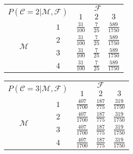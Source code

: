 \documentclass[preview]{standalone}
\newcommand{\M}{\mathcal{M}}
\newcommand{\F}{\mathcal{F}}
\newcommand{\C}{\mathcal{C}}
\begin{document}
	\vspace{1\mytextsize} \newline
	\begin{tabular}{|c|c|c|c|c|}
		\hline
		\multicolumn{2}{|c|}{\multirow{2}{*}{$P(\C = 2|\M,\F)$}} &               \multicolumn{3}{c|}{$\F$}                \\ \cline{3-5}
		\multicolumn{2}{|c|}{}                                 &       $1$        &      $2$       &        $3$         \\ \hline
		\multirow{4}{*}{$\M$} &               $1$                & $\frac{31}{100}$ & $\frac{7}{25}$ & $\frac{589}{1750}$ \\ \cline{2-5}
		                    &               $2$                & $\frac{31}{100}$ & $\frac{7}{25}$ & $\frac{589}{1750}$ \\ \cline{2-5}
		                    &               $3$                & $\frac{31}{100}$ & $\frac{7}{25}$ & $\frac{589}{1750}$ \\ \cline{2-5}
		                    &               $4$                & $\frac{31}{100}$ & $\frac{7}{25}$ & $\frac{589}{1750}$ \\ \hline
	\end{tabular}
	\hspace{0.5\mytextsize}
	\begin{tabular}{|c|c|c|c|c|}
		\hline
		\multicolumn{2}{|c|}{\multirow{2}{*}{$P(\C = 3|\M,\F)$}} &                  \multicolumn{3}{c|}{$\F$}                  \\ \cline{3-5}
		\multicolumn{2}{|c|}{}                                   &        $1$         &        $2$        &        $3$         \\ \hline
		\multirow{4}{*}{$\M$} &               $1$                & $\frac{407}{1700}$ & $\frac{187}{775}$ & $\frac{319}{1750}$ \\ \cline{2-5}
		                      &               $2$                & $\frac{407}{1700}$ & $\frac{187}{775}$ & $\frac{319}{1750}$ \\ \cline{2-5}
		                      &               $3$                & $\frac{407}{1700}$ & $\frac{187}{775}$ & $\frac{319}{1750}$ \\ \cline{2-5}
		                      &               $4$                & $\frac{407}{1700}$ & $\frac{187}{775}$ & $\frac{319}{1750}$ \\ \hline
	\end{tabular}
	\vspace{1\mytextsize} \newline
\end{document}
